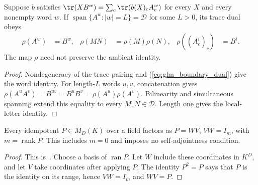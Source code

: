 \begin{lemma}
    \label{thm:glm_boundary_representation}
    \leanok
    Suppose $b$ satisfies
    $\tr(XB^w)=\sum_c\tr(b(X)_cA_c^w)$ for every $X$ and every nonempty
    word $w$. If $\operatorname{span}\{A^w:|w|=L\}=\mathcal D$ for some
    $L>0$, its trace dual obeys
    \begin{align}
        \rho(A^w)       & =B^w,            &
        \rho(MN)        & =\rho(M)\rho(N), &
        \rho((A_c^i)_c) & =B^i.
        \label{eq:glm_boundary_representation}
    \end{align}
    The map $\rho$ need not preserve the ambient identity.
\end{lemma}
\begin{proof}
    \leanok
    Nondegeneracy of the trace pairing and
    (\ref{eq:glm_boundary_dual}) give the word identity.
    For length-$L$ words $u,v$, concatenation gives
    $\rho(A^uA^v)=B^{uv}=B^uB^v=\rho(A^u)\rho(A^v)$.
    Bilinearity and simultaneous spanning extend this equality to every
    $M,N\in\mathcal D$. Length one gives the local-letter identity.
\end{proof}

\begin{lemma}
    \label{thm:glm_boundary_idempotent}
    \leanok
    Every idempotent $P\in M_D(K)$ over a field factors as $P=WV$,
    $VW=I_m$, with $m=\operatorname{rank}P$. This includes $m=0$ and
    imposes no self-adjointness condition.
\end{lemma}
\begin{proof}
    \leanok
    This is~\cite[``Splitting an arbitrary idempotent'']{QICLean2026Blueprint}.
    Choose a basis of $\operatorname{ran}P$. Let $W$ include these
    coordinates in $K^D$, and let $V$ take coordinates after applying $P$.
    The identity $P^2=P$ says that $P$ is the identity on its range, hence
    $VW=I_m$ and $WV=P$.
\end{proof}

